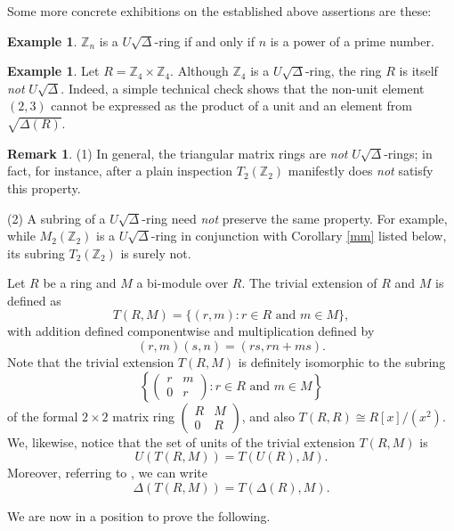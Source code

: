 \documentclass[11pt]{amsart}
\theoremstyle{definition}
\newtheorem{example}[theorem]{Example}
\newtheorem{remark}[theorem]{Remark}
\begin{document}
Some more concrete exhibitions on the established above assertions are these:

\begin{example}
$\mathbb{Z}_n$ is a $U\sqrt{\Delta}$-ring if and only if $n$ is a power of a prime number.
\end{example}

\begin{example}
Let $R = \mathbb{Z}_4 \times \mathbb{Z}_4$. Although $\mathbb{Z}_4$ is a $U\sqrt{\Delta}$-ring, the ring $R$ is itself {\it not} $U\sqrt{\Delta}$. Indeed, a simple technical check shows that the non-unit element $(2,3)$ cannot be expressed as the product of a unit and an element from $\sqrt{\Delta(R)}$.
\end{example}

\begin{remark}
(1) In general, the triangular matrix rings are {\it not} $U\sqrt{\Delta}$-rings; in fact, for instance, after a plain inspection $T_2(\mathbb{Z}_2)$ manifestly does {\it not} satisfy this property.

(2) A subring of a $U\sqrt{\Delta}$-ring need {\it not} preserve the same property. For example, while $M_2(\mathbb{Z}_2)$ is a $U\sqrt{\Delta}$-ring in conjunction with Corollary \ref{mm} listed below, its subring $T_2(\mathbb{Z}_2)$ is surely not.
\end{remark}

Let $R$ be a ring and $M$ a bi-module over $R$. The trivial extension of $R$ and $M$ is defined as
\[ T(R, M) = \{(r, m) : r \in R \text{ and } m \in M\}, \]
with addition defined componentwise and multiplication defined by
\[ (r, m)(s, n) = (rs, rn + ms). \]
Note that the trivial extension $T(R, M)$ is definitely isomorphic to the subring
\[ \left\{ \begin{pmatrix} r & m \\ 0 & r \end{pmatrix} : r \in R \text{ and } m \in M \right\} \]
of the formal $2 \times 2$ matrix ring $\begin{pmatrix} R & M \\ 0 & R \end{pmatrix}$, and also $T(R, R) \cong R[x]/(x^2)$. We, likewise, notice that the set of units of the trivial extension $T(R, M)$ is
\[ U(T(R, M)) = T(U(R), M). \]
Moreover, referring to \cite{kara}, we can write
\[ \Delta(T(R, M)) = T(\Delta(R), M). \]

\medskip

We are now in a position to prove the following.
\end{document}

